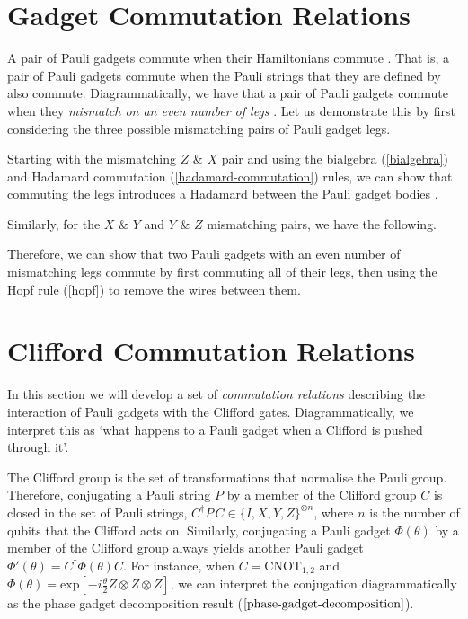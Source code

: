 \section{Gadget Commutation Relations}%
\label{gadget-commutation-relations}

A pair of Pauli gadgets commute when their Hamiltonians commute \cite{Yeung2020}. That is, a pair of Pauli gadgets commute when the Pauli strings that they are defined by also commute. Diagrammatically, we have that a pair of Pauli gadgets commute when they \textit{mismatch on an even number of legs} \cite{Yeung2020}. Let us demonstrate this by first considering the three possible mismatching pairs of Pauli gadget legs.


Starting with the mismatching $Z$ \& $X$ pair and using the bialgebra (\ref{bialgebra}) and Hadamard commutation (\ref{hadamard-commutation}) rules, we can show that commuting the legs introduces a Hadamard between the Pauli gadget bodies \cite{Yeung2020}.


Similarly, for the $X$ \& $Y$ and $Y$ \& $Z$ mismatching pairs, we have the following.


Therefore, we can show that two Pauli gadgets with an even number of mismatching legs commute by first commuting all of their legs, then using the Hopf rule (\ref{hopf}) to remove the wires between them.


\section{Clifford Commutation Relations}%
\label{commutation-relations}

In this section we will develop a set of \textit{commutation relations} describing the interaction of Pauli gadgets with the Clifford gates. Diagrammatically, we interpret this as `what happens to a Pauli gadget when a Clifford is pushed through it'.

The Clifford group is the set of transformations that normalise the Pauli group. Therefore, conjugating a Pauli string $P$ by a member of the Clifford group $C$ is closed in the set of Pauli strings, $C^\dagger P \, C \in \{I, X, Y, Z\}^{\otimes n}$, where $n$ is the number of qubits that the Clifford acts on. Similarly, conjugating a Pauli gadget $\Phi(\theta)$ by a member of the Clifford group always yields another Pauli gadget $\Phi'(\theta) = C^\dagger \Phi(\theta) C$. For instance, when $C = \text{CNOT}_{1, 2}$ and $\Phi(\theta) = \text{exp} \left[ - i\frac{\theta}{2} Z \otimes Z \otimes Z \right]$, we can interpret the conjugation diagrammatically as the phase gadget decomposition result ($\ref{phase-gadget-decomposition}$).

